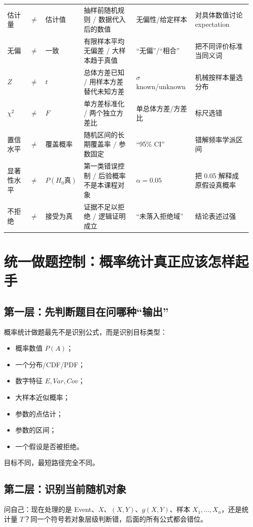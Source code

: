 \documentclass[11pt,a4paper,openany]{ctexbook}
\begin{document}
\begin{longtable}{L{1.7cm}@{}>{\centering\arraybackslash}p{0.35cm}@{}L{1.7cm}L{3.3cm}L{3.3cm}L{\dimexpr\linewidth-10.72cm\relax}}
估计量 & $\neq$ & 估计值 & 抽样前随机规则 / 数据代入后的数值 & 无偏性/给定样本 & 对具体数值讨论 expectation\\
无偏 & $\neq$ & 一致 & 有限样本平均无偏差 / 大样本趋于真值 & “无偏”/“相合” & 把不同评价标准当同义词\\
$Z$ & $\neq$ & $t$ & 总体方差已知 / 用样本方差替代未知方差 & $\sigma$ known/unknown & 机械按样本量选分布\\
$\chi^2$ & $\neq$ & $F$ & 单方差标准化 / 两个独立方差比 & 单总体方差/方差比 & 标尺选错\\
置信水平 & $\neq$ & 覆盖概率 & 随机区间的长期覆盖率 / 参数固定 & “95\% CI” & 错解频率学派区间\\
显著性水平 & $\neq$ & $P(H_0\text{真})$ & 第一类错误控制 / 后验概率不是本课程对象 & $\alpha=0.05$ & 把 0.05 解释成原假设真概率\\
不拒绝 & $\neq$ & 接受为真 & 证据不足以拒绝 / 逻辑证明成立 & “未落入拒绝域” & 结论表述过强\\
\bottomrule
\end{longtable}

\chapter{统一做题控制：概率统计真正应该怎样起手}

\section{第一层：先判断题目在问哪种“输出”}
概率统计做题最先不是识别公式，而是识别目标类型：
\begin{itemize}
  \item 概率数值 $P(A)$；
  \item 一个分布/CDF/PDF；
  \item 数字特征 $E,Var,Cov$；
  \item 大样本近似概率；
  \item 参数的点估计；
  \item 参数的区间；
  \item 一个假设是否被拒绝。
\end{itemize}
目标不同，最短路径完全不同。

\section{第二层：识别当前随机对象}
问自己：现在处理的是 Event、$X$、$(X,Y)$、$g(X,Y)$、样本 $X_1,\dots,X_n$，还是统计量 $T$？同一个符号若对象层级判断错，后面的所有公式都会错位。
\end{document}
